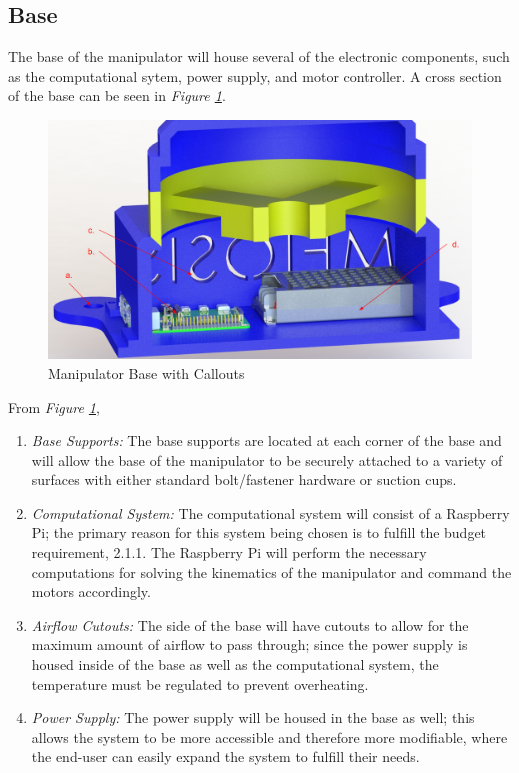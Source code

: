 \documentclass[12pt]{report}
\begin{document}
\subsection{Base}
The base of the manipulator will house several of the electronic components, such as the computational sytem, power supply, and motor controller. A cross section of the base can be seen in \emph{Figure \ref{fig:base}}.
\begin{figure}[htp]
  \centering
  \includegraphics[frame, width=.75\textwidth]{base_callouts}
  \caption{Manipulator Base with Callouts}
  \label{fig:base}
\end{figure}

From \emph{Figure \ref{fig:base}},
\vspace{-\baselineskip}
\begin{enumerate}[label=\alph*.]
  \item \emph{Base Supports:}
  The base supports are located at each corner of the base and will allow the base of the manipulator to be securely attached to a variety of surfaces with either standard bolt/fastener hardware or suction cups.
  \item \emph{Computational System:}
  The computational system will consist of a Raspberry Pi; the primary reason for this system being chosen is to fulfill the budget requirement, 2.1.1. The Raspberry Pi will perform the necessary computations for solving the kinematics of the manipulator and command the motors accordingly.
  \item \emph{Airflow Cutouts:}
  The side of the base will have cutouts to allow for the maximum amount of airflow to pass through; since the power supply is housed inside of the base as well as the computational system, the temperature must be regulated to prevent overheating.
  \item \emph{Power Supply:}
  The power supply will be housed in the base as well; this allows the system to be more accessible and therefore more modifiable, where the end-user can easily expand the system to fulfill their needs.
\end{enumerate}
\end{document}
